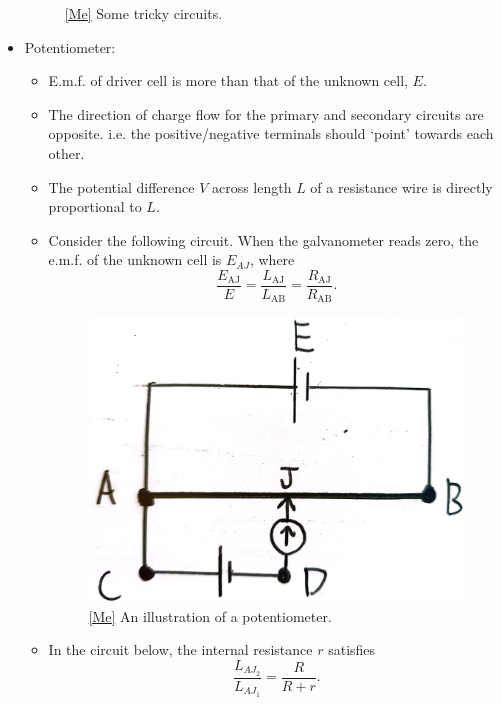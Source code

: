 \begin{itemize}
\begin{figure}[H]
\begin{subfigure}{0.45\textwidth}
            \caption{}
            \label{}
        \end{subfigure}
        \caption{\ref{Me} Some tricky circuits.}
        \label{fig:tricky-circuits}
    \end{figure}
    \item Potentiometer:
    \begin{itemize}
        \item E.m.f. of driver cell is more than that of the unknown cell, \(E\).
        \item The direction of charge flow for the primary and secondary circuits are opposite. i.e. the positive/negative terminals should `point' towards each other.
        \item The potential difference \(V\) across length \(L\) of a resistance wire is directly proportional to \(L\).
        \item Consider the following circuit. When the galvanometer reads zero, the e.m.f. of the unknown cell is \(E_{AJ}\), where 
        \[\frac{E_{\text{AJ}}}{E}=\frac{L_{\text{AJ}}}{L_{\text{AB}}}=\frac{R_{\text{AJ}}}{R_{\text{AB}}}.\]
        \begin{figure}[H]
            \centering
            \includegraphics[width=0.4\columnwidth]{../images/DC-Circuits-Potentiometer-1.jpg}
            \caption{\ref{Me} An illustration of a potentiometer.}
            \label{fig:potentiometer}
        \end{figure}
        \item In the circuit below, the internal resistance \(r\) satisfies
        \[\frac{L_{AJ_2}}{L_{AJ_1}}=\frac{R}{R+r}.\]
        \begin{figure}[H]
            \centering
            \begin{subfigure}{0.45\textwidth}
                \centering

\end{subfigure}
\end{figure}
\end{itemize}
\end{itemize}
